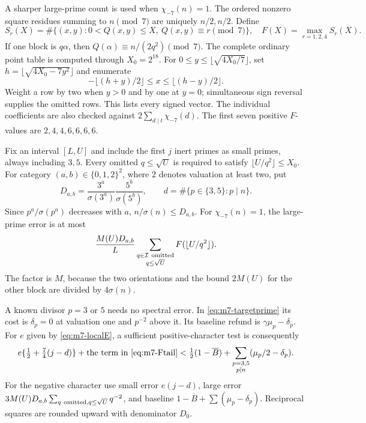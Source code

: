 A sharper large-prime count is used when \(\chi_{-7}(n)=1\).
The ordered nonzero square residues summing to \(n\pmod7\)
are uniquely \(n/2,n/2\). Define
\[
 S_r(X)=\#\{(x,y):0<Q(x,y)\le X,\ Q(x,y)\equiv r\pmod7\},
 \quad F(X)=\max_{r=1,2,4}S_r(X).
\]
If one block is \(q\alpha\), then
\(Q(\alpha)\equiv n/(2q^2)\pmod7\).
The complete ordinary point table is computed through \(X_0=2^{18}\).
For \(0\le y\le\lfloor\sqrt{4X_0/7}\rfloor\), set
\(h=\lfloor\sqrt{4X_0-7y^2}\rfloor\) and enumerate
\[
          -\lfloor(h+y)/2\rfloor\le x\le\lfloor(h-y)/2\rfloor.
\]
Weight a row by two when \(y>0\) and by one at \(y=0\);
simultaneous sign reversal supplies the omitted rows.
This lists every signed vector. The individual coefficients are
also checked against \(2\sum_{d\mid t}\chi_{-7}(d)\).
The first seven positive \(F\)-values are \(2,4,4,6,6,6,6\).

Fix an interval \([L,U]\) and include the first \(j\) inert primes
as small primes, always including \(3,5\).
Every omitted \(q\le\sqrt U\) is required to satisfy
\(\lfloor U/q^2\rfloor\le X_0\).
For category \((a,b)\in\{0,1,2\}^2\), where \(2\) denotes
valuation at least two, put
\[
 D_{a,b}=\frac{3^a}{\sigma(3^a)}\frac{5^b}{\sigma(5^b)},\qquad
 d=\#\{p\in\{3,5\}:p\mid n\}.
\]
Since \(p^a/\sigma(p^a)\) decreases with \(a\),
\(n/\sigma(n)\le D_{a,b}\).
For \(\chi_{-7}(n)=1\), the large-prime error is at most
\begin{equation}
 \frac{M(U)D_{a,b}}L
       \sum_{\substack{q\in\mathcal I\ {\rm omitted}\\q\le\sqrt U}}
                              F(\lfloor U/q^2\rfloor).         \label{eq:m7-Ftail}
\end{equation}
The factor is \(M\), because the two orientations and the bound
\(2M(U)\) for the other block are divided by \(4\sigma(n)\).

A known divisor \(p=3\) or \(5\) needs no spectral error.
In \eqref{eq:m7-targetprime} its cost is
\(\delta_p=0\) at valuation one and \(p^{-2}\) above it.
Its baseline refund is \(\gamma\mu_p-\delta_p\).
For \(e\) given by \eqref{eq:m7-localE}, a sufficient
positive-character test is consequently
\begin{equation}
 e\{\tfrac12+\tfrac74(j-d)\}
       +\hbox{the term in \eqref{eq:m7-Ftail}}
 <
 \tfrac12(1-\overline B)+
           \sum_{\substack{p=3,5\\p\mid n}}(\mu_p/2-\delta_p).
                                                                    \label{eq:m7-finetest}
\end{equation}
For the negative character use small error \(e(j-d)\),
large error
\(3M(U)D_{a,b}\sum_{q\ {\rm omitted},q\le\sqrt U}q^{-2}\),
and baseline \(1-\overline B+\sum(\mu_p-\delta_p)\).
Reciprocal squares are rounded upward with denominator \(D_0\).

